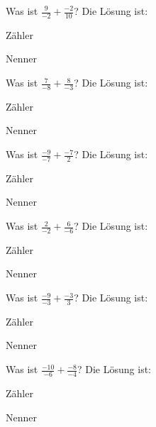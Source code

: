 \documentclass{ximera}
\begin{document}
\begin{shuffle}
\begin{question}
Was ist $\frac{9}{-2} + \frac{-2}{10}$?
Die Lösung ist:
\begin{solution}
Zähler 
\end{solution}
\begin{solution}
Nenner 
\end{solution}
\end{question}


\begin{question}
Was ist $\frac{7}{-8} + \frac{8}{-3}$?
Die Lösung ist:
\begin{solution}
Zähler 
\end{solution}
\begin{solution}
Nenner 
\end{solution}
\end{question}


\begin{question}
Was ist $\frac{-9}{-7} + \frac{-7}{2}$?
Die Lösung ist:
\begin{solution}
Zähler 
\end{solution}
\begin{solution}
Nenner 
\end{solution}
\end{question}


\begin{question}
Was ist $\frac{2}{-2} + \frac{6}{-6}$?
Die Lösung ist:
\begin{solution}
Zähler 
\end{solution}
\begin{solution}
Nenner 
\end{solution}
\end{question}


\begin{question}
Was ist $\frac{-9}{-3} + \frac{-3}{3}$?
Die Lösung ist:
\begin{solution}
Zähler 
\end{solution}
\begin{solution}
Nenner 
\end{solution}
\end{question}


\begin{question}
Was ist $\frac{-10}{-6} + \frac{-8}{-4}$?
Die Lösung ist:
\begin{solution}
Zähler 
\end{solution}
\begin{solution}
Nenner 
\end{solution}
\end{question}



\end{shuffle}
\end{document}
